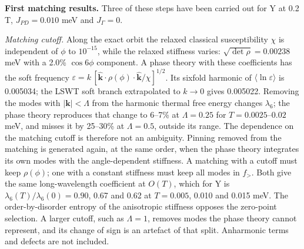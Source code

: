 \label{sec-nbcp-matching-results}\textbf{First matching results.} Three
of these steps have been carried out for Y at 0.2 T,
\(J_{PD}=0.010\) meV and \(J_\Gamma=0\).

\emph{Matching cutoff.} Along the exact orbit the relaxed classical
susceptibility \(\chi\) is independent of \(\phi\) to \(10^{-15}\),
while the relaxed stiffness varies: \(\sqrt{\det\rho}=0.00238\) meV
with a 2.0\% \(\cos6\phi\) component. A phase theory with these
coefficients has the soft frequency
\(\varepsilon=k\,[\hat{\mathbf k}\cdot\rho(\phi)\cdot\hat{\mathbf k}/\chi]^{1/2}\).
Its sixfold harmonic of \(\langle\ln\varepsilon\rangle\) is 0.005034;
the LSWT soft branch extrapolated to \(k\to0\) gives 0.005022. Removing
the modes with \(|\mathbf k|<\Lambda\) from the harmonic thermal free
energy changes \(\lambda_6\); the phase theory reproduces that change
to 6--7\% at \(\Lambda=0.25\) for \(T=0.0025\)--\(0.02\) meV, and
misses it by 25--30\% at \(\Lambda=0.5\), outside its range. The
dependence on the matching cutoff is therefore not an ambiguity. Pinning
removed from the matching is generated again, at the same order, when
the phase theory integrates its own modes with the angle-dependent
stiffness. A matching with a cutoff must keep \(\rho(\phi)\); one with
a constant stiffness must keep all modes in \(f_>\). Both give the same
long-wavelength coefficient at \(O(T)\), which for Y is
\(\lambda_6(T)/\lambda_6(0)=0.90\), 0.67 and 0.62 at \(T=0.005\),
0.010 and 0.015 meV. The order-by-disorder entropy of the anisotropic
stiffness opposes the zero-point selection. A larger cutoff, such as
\(\Lambda=1\), removes modes the phase theory cannot represent, and its
change of sign is an artefact of that split. Anharmonic terms and
defects are not included.

